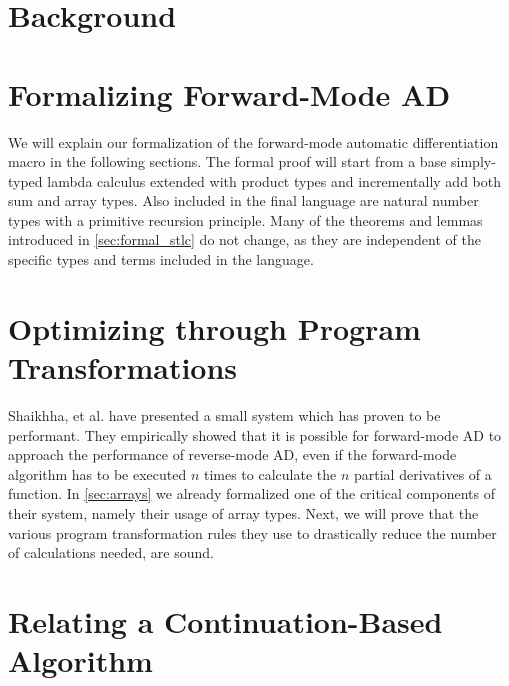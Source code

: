 \documentclass[11pt, final]{article}
\begin{document}

\newpage


\newpage

\setcounter{page}{3}
\tableofcontents
\newpage
{}


\section{Background}\label{sec:bg}





% 

\section{Formalizing Forward-Mode AD}\label{sec:forward}
  We will explain our formalization of the forward-mode automatic differentiation macro in the following sections.
  The formal proof will start from a base simply-typed lambda calculus extended with product types and incrementally add both sum and array types.
  Also included in the final language are natural number types with a primitive recursion principle.
  Many of the theorems and lemmas introduced in \cref{sec:formal_stlc} do not change, as they are independent of the specific types and terms included in the language.
  
  
  
\section{Optimizing through Program Transformations}\label{sec:opt}
  Shaikhha, et al. have presented a small system which has proven to be performant\cite{Shaikha2019}.
  They empirically showed that it is possible for forward-mode AD to approach the performance of reverse-mode AD, even if the forward-mode algorithm has to be executed $n$ times to calculate the $n$ partial derivatives of a function.
  In \cref{sec:arrays} we already formalized one of the critical components of their system, namely their usage of array types.
  Next, we will prove that the various program transformation rules they use to drastically reduce the number of calculations needed, are sound.

  
\section{Relating a Continuation-Based Algorithm}\label{sec:continuation-base}
  
\end{document}
